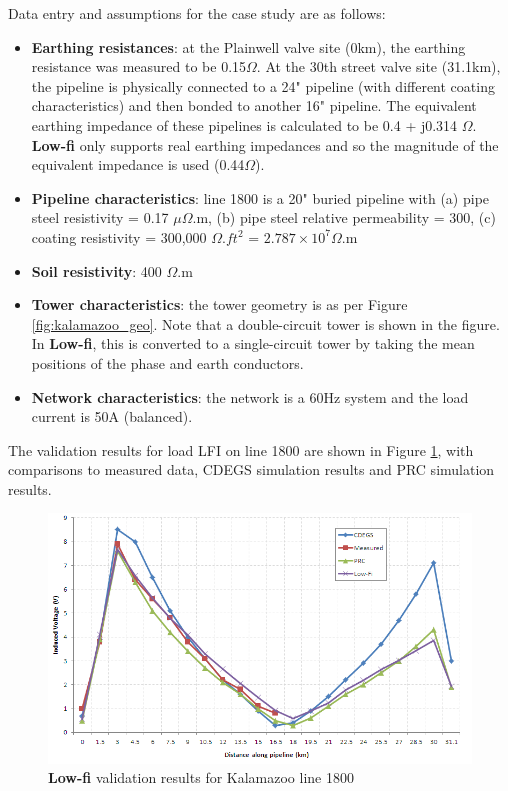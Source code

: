 \documentclass{article}
\begin{document}
Data entry and assumptions for the case study are as follows:
\begin{itemize}
\item \textbf{Earthing resistances}: at the Plainwell valve site (0km), the earthing resistance was measured to be 0.15$\Omega$. At the 30th street valve site (31.1km), the pipeline is physically connected to a 24" pipeline (with different coating characteristics) and then bonded to another 16" pipeline. The equivalent earthing impedance of these pipelines is calculated to be 0.4 + j0.314 $\Omega$. \textbf{Low-fi} only supports real earthing impedances and so the magnitude of the equivalent impedance is used (0.44$\Omega$).
\item \textbf{Pipeline characteristics}: line 1800 is a 20" buried pipeline with (a) pipe steel resistivity = 0.17 $\mu\Omega$.m, (b) pipe steel relative permeability = 300, (c) coating resistivity = 300,000 $\Omega.ft^{2}$ = $2.787 \times 10^{7} \Omega$.m
\item \textbf{Soil resistivity}: 400 $\Omega$.m
\item \textbf{Tower characteristics}: the tower geometry is as per Figure \ref{fig:kalamazoo_geo}. Note that a double-circuit tower is shown in the figure. In \textbf{Low-fi}, this is converted to a single-circuit tower by taking the mean positions of the phase and earth conductors.
\item \textbf{Network characteristics}: the network is a 60Hz system and the load current is 50A (balanced).
\end{itemize}

The validation results for load LFI on line 1800 are shown in Figure \ref{fig:kalamazoo_comparison}, with comparisons to measured data, CDEGS simulation results and PRC simulation results.

\begin{figure}[!htp]
\begin{center}
\caption{\textbf{Low-fi} validation results for Kalamazoo line 1800}
\label{fig:kalamazoo_comparison}
\includegraphics[width=\linewidth]{./Figures/kalamazoo_comparison.png}
\end{center}
\end{figure}
\end{document}
